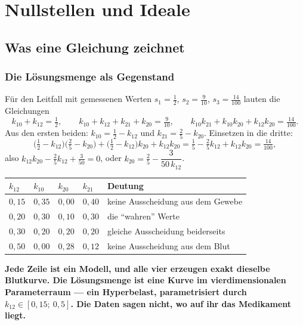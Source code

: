\part{Nullstellen und Ideale}

\chapter{Was eine Gleichung zeichnet}

\section{Die Lösungsmenge als Gegenstand}

\begin{merksatz}
Für den Leitfall mit gemessenen Werten $s_1 = \tfrac12$, $s_2 = \tfrac{9}{10}$, $s_3 = \tfrac{14}{100}$ lauten die Gleichungen
\[ k_{10} + k_{12} = \tfrac12, \qquad k_{10} + k_{12} + k_{21} + k_{20} = \tfrac{9}{10}, \qquad k_{10}k_{21} + k_{10}k_{20} + k_{12}k_{20} = \tfrac{14}{100} . \]
Aus den ersten beiden: $k_{10} = \tfrac12 - k_{12}$ und $k_{21} = \tfrac{2}{5} - k_{20}$. Einsetzen in die dritte:
\[ \bigl(\tfrac12 - k_{12}\bigr)\bigl(\tfrac25 - k_{20}\bigr) + \bigl(\tfrac12 - k_{12}\bigr)k_{20} + k_{12}k_{20} = \tfrac15 - \tfrac25 k_{12} + k_{12}k_{20} = \tfrac{14}{100}, \]
also $k_{12}k_{20} - \tfrac25 k_{12} + \tfrac{3}{50} = 0$, oder $k_{20} = \tfrac25 - \dfrac{3}{50\,k_{12}}$.

\begin{center}
{\small
\renewcommand{\arraystretch}{1.46}
\begin{tabular}{@{}P{1.4cm}P{1.4cm}P{1.4cm}P{1.4cm}P{2.6cm}@{}}
\toprule
$k_{12}$ & $k_{10}$ & $k_{20}$ & $k_{21}$ & \textbf{Deutung}\\
\midrule
$0{,}15$ & $0{,}35$ & $0{,}00$ & $0{,}40$ & keine Ausscheidung aus dem Gewebe\\
$0{,}20$ & $0{,}30$ & $0{,}10$ & $0{,}30$ & die \enquote{wahren} Werte\\
$0{,}30$ & $0{,}20$ & $0{,}20$ & $0{,}20$ & gleiche Ausscheidung beiderseits\\
$0{,}50$ & $0{,}00$ & $0{,}28$ & $0{,}12$ & keine Ausscheidung aus dem Blut\\
\bottomrule
\end{tabular}}
\end{center}

\begin{center}
\begin{minipage}{0.9\textwidth}
\textbf{Jede Zeile ist ein Modell, und alle vier erzeugen exakt dieselbe Blutkurve. Die Lösungsmenge ist eine Kurve im vierdimensionalen Parameterraum --- ein Hyperbelast, parametrisiert durch $k_{12}\in[0{,}15;\ 0{,}5]$. Die Daten sagen nicht, wo auf ihr das Medikament liegt.}
\end{minipage}
\end{center}


\end{merksatz}
